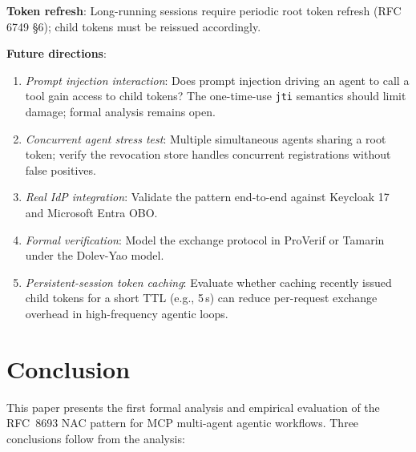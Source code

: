 \documentclass[journal]{IEEEtran}
\begin{document}
\textbf{Token refresh}: Long-running sessions require periodic root token refresh
(RFC 6749 §6); child tokens must be reissued accordingly.

\textbf{Future directions}:
\begin{enumerate}
  \item \textit{Prompt injection interaction}: Does prompt injection driving an
        agent to call a tool gain access to child tokens? The one-time-use
        \texttt{jti} semantics should limit damage; formal analysis remains open.
  \item \textit{Concurrent agent stress test}: Multiple simultaneous agents
        sharing a root token; verify the revocation store handles concurrent
        registrations without false positives.
  \item \textit{Real IdP integration}: Validate the pattern end-to-end against
        Keycloak 17 and Microsoft Entra OBO.
  \item \textit{Formal verification}: Model the exchange protocol in ProVerif
        \cite{blanchet2001} or Tamarin \cite{meier2013} under the Dolev-Yao
        model.
  \item \textit{Persistent-session token caching}: Evaluate whether caching
        recently issued child tokens for a short TTL (e.g., 5\,s) can reduce
        per-request exchange overhead in high-frequency agentic loops.
\end{enumerate}


\FloatBarrier  %

\section{Conclusion}
\label{sec:conclusion}

This paper presents the first formal analysis and empirical evaluation of the
RFC~8693 NAC pattern for MCP multi-agent agentic workflows. Three conclusions
follow from the analysis:
\end{document}
